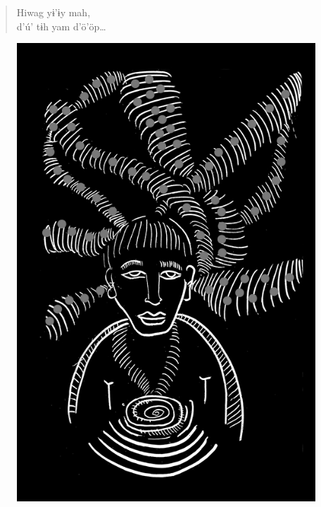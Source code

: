 \begin{verse}
Hiwag yɨ’ɨy mah,\\
d’ú’ tɨh yam d’ö’öp\ldots{}
\end{verse}

\vspace*{\fill}

\begin{figure}
\vspace*{-1.5cm}
\hspace*{-2.4cm}\includegraphics[width=142mm]{./imgs/img4.jpg}
\end{figure}

\chapter*{}

